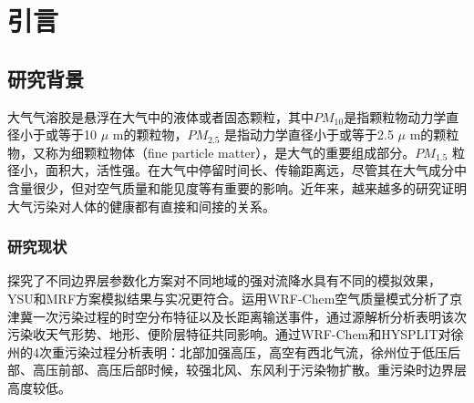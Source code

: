 \chapter{引言}\label{chap:introduction}

\section{研究背景}

大气气溶胶是悬浮在大气中的液体或者固态颗粒，其中$PM_{10}$是指颗粒物动力学直径小于或等于10 $\mu$ m的颗粒物，$PM_{2.5}$ 是指动力学直径小于或等于2.5 $\mu$ m的颗粒物，又称为细颗粒物体（fine particle matter），是大气的重要组成部分。$PM_{1.5}$ 粒径小，面积大，活性强。在大气中停留时间长、传输距离远，尽管其在大气成分中含量很少，但对空气质量和能见度等有重要的影响。近年来，越来越多的研究证明大气污染对人体的健康都有直接和间接的关系。

\subsection{研究现状}

\citet{唐洁2019三种}探究了不同边界层参数化方案对不同地域的强对流降水具有不同的模拟效果，YSU和MRF方案模拟结果与实况更符合。\citet{张颖龙2017基于}运用WRF-Chem空气质量模式分析了京津冀一次污染过程的时空分布特征以及长距离输送事件，通过源解析分析表明该次污染收天气形势、地形、便阶层特征共同影响。\citet{王瑾2017基于}通过WRF-Chem和HYSPLIT对徐州的4次重污染过程分析表明：北部加强高压，高空有西北气流，徐州位于低压后部、高压前部、高压后部时候，较强北风、东风利于污染物扩散。重污染时边界层高度较低。

